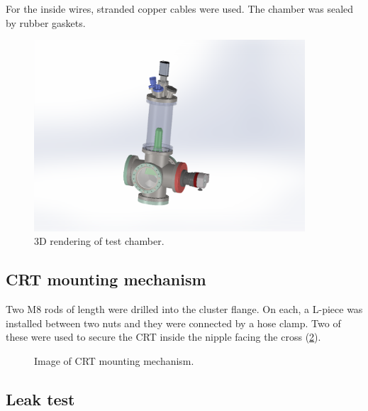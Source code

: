 For the inside wires, stranded copper cables were used. The chamber was sealed by rubber gaskets.
 
\begin{figure}[ht]
	\centering
 	
	\includegraphics[width=0.9\textwidth]{./Chapters/vacuum-chamber/test_chamber} %
	
	\caption{3D rendering of test chamber.}
	\label{fig:3D rendering of test chamber}
\end{figure}
 
\subsection{CRT mounting mechanism}
\label{subsec:CRT mounting mechanism}

 Two M8 rods of length  were drilled into the cluster flange. On each, a L-piece was installed between two nuts and they were connected by a hose clamp. Two of these were used to secure the CRT inside the nipple facing the cross (\cref{fig:Image of CRT mounting mechanism}).
 

\begin{figure}[h]
	\centering
	
	
	\caption{Image of CRT mounting mechanism.}
	\label{fig:Image of CRT mounting mechanism}
\end{figure}


\subsection{Leak test}
\label{subsec:Leak test}


